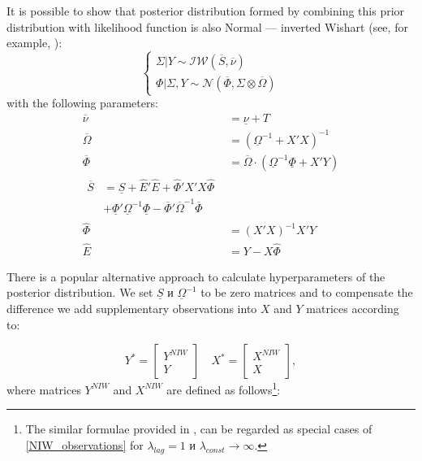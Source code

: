 \documentclass[11pt]{article} %
\newcommand{\cN}{\mathcal{N}}
\newcommand{\cIW}{\mathcal{IW}}
\newcommand{\prior}{\underline}
\newcommand{\post}{\overline}
\begin{document}
It is possible to show that posterior distribution formed by combining this prior distribution with likelihood function is also Normal --- inverted Wishart (see, for example, \cite{zellner_1996}):
\begin{equation}
\begin{cases}
\Sigma|Y \sim \cIW(\post S, \post \nu) \\
\Phi|\Sigma,Y\sim \cN (\post \Phi, \Sigma\otimes\post \Omega) 
\end{cases}
\end{equation}
with the following parameters:
\begin{align*}
\post\nu &=\prior \nu+T\\
\post{\Omega}&=(\prior \Omega^{-1}+X'X)^{-1}\\
\post \Phi&=\post{\Omega}\cdot (\prior \Omega^{-1}\prior \Phi+X'Y)\\
\begin{split}
\post S&=\prior S +\hat E'\hat E+\hat \Phi'
 X'X \hat \Phi \\&+\prior \Phi'\prior\Omega^{-1}\prior \Phi-\post \Phi'\post\Omega^{-1}\post \Phi
 \end{split}\\
\hat\Phi&=(X'X)^{-1}X'Y\\%
\hat E&=Y-X\hat\Phi
\end{align*}

There is a popular alternative approach to calculate hyperparameters of the posterior distribution. 
We set $\prior S$ и $\prior \Omega^{-1}$ to be zero matrices and to compensate the difference we add supplementary observations into  $X$ and  $Y$ matrices according to:

\begin{equation}\label{star_sample}
Y^*=\begin{bmatrix}
Y^{NIW} \\
Y 
\end{bmatrix}
\quad
X^*=\begin{bmatrix}
X^{NIW} \\
X 
\end{bmatrix},
\end{equation}
where matrices $Y^{NIW}$ and $X^{NIW}$ are defined as follows\footnote{The similar formulae provided in \cite{banbura_al_2010}, \cite{berg_henzel_2013} can be regarded as special cases of  \eqref{NIW_observations} for $\lambda_{lag}=1$ и $\lambda_{const}\to\infty$.}:
\end{document}
